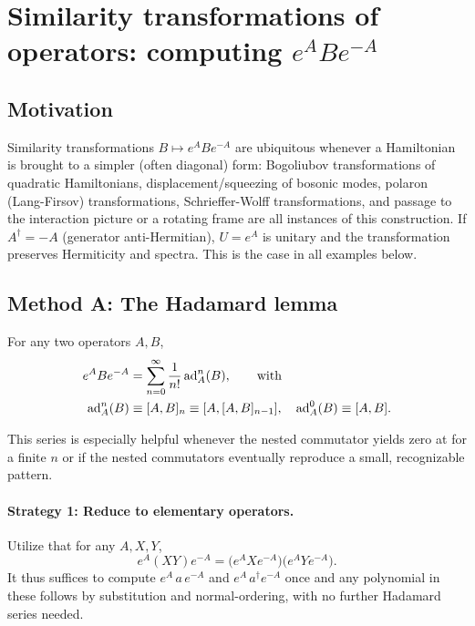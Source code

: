 \documentclass[../main.tex]{subfiles}
\begin{document}
\section{Similarity transformations of operators: computing \texorpdfstring{$e^{A}Be^{-A}$}{eABe-A}}
\label{sec:similarity-transformations}

\subsection{Motivation}

Similarity transformations $B\mapsto e^{A}Be^{-A}$ are ubiquitous whenever a Hamiltonian is
brought to a simpler (often diagonal) form: Bogoliubov transformations of quadratic
Hamiltonians, displacement/squeezing of bosonic modes, polaron (Lang-Firsov)
transformations, Schrieffer-Wolff transformations, and passage to the interaction
picture or a rotating frame are all instances of this construction. If $A^\dagger=-A$
(generator anti-Hermitian), $U=e^{A}$ is unitary and the transformation preserves
Hermiticity and spectra. This is the case in all examples below.

\subsection{Method A: The Hadamard lemma}

\begin{lemma*}
For any two operators $A,B$,
\begin{align}
e^{A}Be^{-A} &= \sum_{n=0}^{\infty}\frac{1}{n!}\,\mathrm{ad}_A^n(B),\qquad \text{with} \\
\mathrm{ad}_A^n(B) &\equiv [A,B]_{n} \equiv [A, [A,B]_{n-1}] ,\quad \mathrm{ad}_A^0(B)\equiv[A,B] .
\end{align}
\end{lemma*}

This series is especially helpful whenever the nested commutator yields zero at for a finite $n$ or if the nested commutators eventually reproduce a small, recognizable pattern.

\paragraph{Strategy 1: Reduce to elementary operators.}
Utilize that for any $A,X,Y$,
\begin{equation}
e^{A}(XY)e^{-A}=\big(e^{A}Xe^{-A}\big)\big(e^{A}Ye^{-A}\big).
\end{equation}
It thus suffices to compute $e^{A}\,a\,e^{-A}$ and $e^{A}\,a^\dagger e^{-A}$ once and any
polynomial in these follows by substitution and normal-ordering, with no further
Hadamard series needed.
\end{document}
